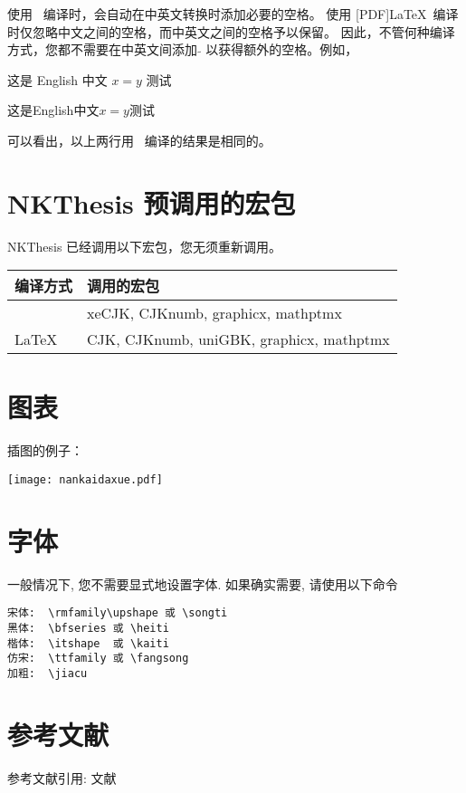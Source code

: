 使用 \XeLaTeX\ 编译时，会自动在中英文转换时添加必要的空格。 使用 [PDF]\LaTeX\
编译时仅忽略中文之间的空格，而中英文之间的空格予以保留。
因此，不管何种编译方式，您都不需要在中英文间添加 $\tilde{}$ 以获得额外的空格。例如，

这是 English 中文 $x=y$ 测试

这是English中文$x=y$测试

可以看出，以上两行用 \XeLaTeX\ 编译的结果是相同的。


\section{NKThesis 预调用的宏包}

NKThesis 已经调用以下宏包，您无须重新调用。

\begin{center}
\begin{tabular}{l|l}
\hline
编译方式 & 调用的宏包\\ \hline
\XeLaTeX & xeCJK, CJKnumb, graphicx, mathptmx \\ \hline
[PDF]\LaTeX & CJK, CJKnumb, uniGBK, graphicx, mathptmx \\
\hline
\end{tabular}
\end{center}


\section{图表}

插图的例子：

\begin{center}
\texttt{[image: nankaidaxue.pdf]}
\end{center}

\section{字体}

一般情况下, 您不需要显式地设置字体. 如果确实需要, 请使用以下命令

\begin{verbatim}
宋体:  \rmfamily\upshape 或 \songti
黑体:  \bfseries 或 \heiti
楷体:  \itshape  或 \kaiti
仿宋:  \ttfamily 或 \fangsong
加粗:  \jiacu
\end{verbatim}


\section{参考文献} \label{manual:ref}
参考文献引用:
\cite{ChenCheChen2001,Nadkarni-1992,Hua-Wang-1973}
文献\cite{ZhuKeZhen,Huo}\cite{Timoshenko,Zhang-Wang}
\cite[Theorem 2.1]{ZhuKeZhen}

